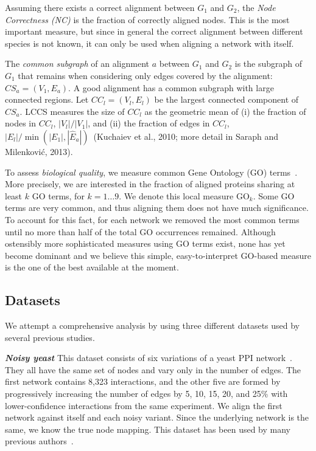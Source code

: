 \documentclass{bioinfo}
\newcommand{\Eb}{\hat{E}}
\begin{document}
Assuming there exists a correct alignment between $G_1$ and $G_2$, the {\it Node Correctness (NC)} is the fraction of correctly aligned nodes. This is the most important measure, but since in general the correct alignment between different species is not known, it can only be used when aligning a network with itself.

The \textit{common subgraph} of an alignment $a$ between $G_1$ and $G_2$ is the subgraph of $G_1$ that remains when considering only edges covered by the alignment: $CS_a=(V_1,E_a)$. A good alignment has a common subgraph with large connected regions. Let $CC_l=(V_l,E_l)$ be the largest connected component of $CS_a$. LCCS measures the size of $CC_l$ as the geometric mean of (i) the fraction of nodes in $CC_l$, $|V_l|/|V_1|$, and (ii) the fraction of edges in $CC_l$, $|E_l|/\min(|E_1|,|\Eb_a|)$~(Kuchaiev et al., 2010; more detail in Saraph and Milenkovi\'{c}, 2013).

To assess {\it biological quality}, we measure common Gene Ontology (GO) terms~\citep{GOterms}. More precisely, we are interested in the fraction of aligned proteins sharing at least $k$ GO terms, for $k=1\ldots 9$. We denote this local measure $\mbox{GO}_k$. Some GO terms are very common, and thus aligning them does not have much significance. To account for this fact, for each network we removed the most common terms until no more than half of the total GO occurrences remained. Although ostensibly more sophisticated measures using GO terms exist, none has yet become dominant and we believe this simple, easy-to-interpret GO-based measure is the one of the best available at the moment.

\subsection{Datasets}\label{datadescription}

We attempt a comprehensive analysis by using three different datasets used by several previous studies.

\emph{\textbf{Noisy yeast}} This dataset consists of six variations of a yeast PPI network~\citep{Collins01032007}. They all have the same set of nodes and vary only in the number of edges. The first network contains 8,323 interactions, and the other five are formed by progressively increasing the number of edges by 5, 10, 15, 20, and 25\% with lower-confidence interactions from the same experiment. We align the first network against itself and each noisy variant. Since the underlying network is the same, we know the true node mapping. This dataset has been used by many previous authors~\citep{MAGNA,GHOST,WAVE,GREAT}.
\end{document}

